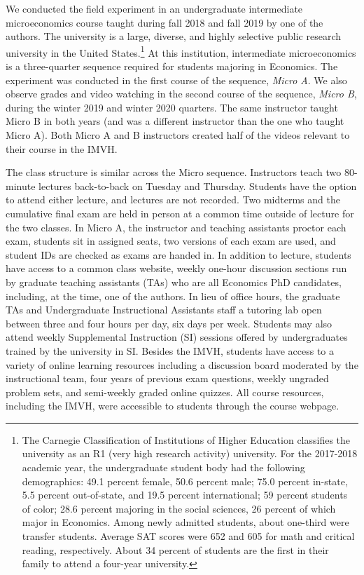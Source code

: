 We conducted the field experiment in an undergraduate intermediate microeconomics course taught during fall 2018 and fall 2019 by one of the authors.
The university is a large, diverse, and highly selective public research university in the United States.\footnote{The Carnegie Classification of Institutions of Higher Education classifies the university as an R1 (very high research activity) university.
    For the 2017-2018 academic year, the undergraduate student body had the following demographics: 49.1 percent female, 50.6 percent male; 75.0 percent in-state, 5.5 percent out-of-state, and 19.5 percent international; 59 percent students of color; 28.6 percent majoring in the social sciences, 26 percent of which major in Economics.
	Among newly admitted students, about one-third were transfer students.
	Average SAT scores were 652 and 605 for math and critical reading, respectively.
	About 34 percent of students are the first in their family to attend a four-year university.
}
At this institution, intermediate microeconomics is a three-quarter sequence required for students majoring in Economics.
The experiment was conducted in the first course of the sequence, \textit{Micro A}.
We also observe grades and video watching in the second course of the sequence, \textit{Micro B}, during the winter 2019 and winter 2020 quarters.
The same instructor taught Micro B in both years (and was a different instructor than the one who taught Micro A).
Both Micro A and B instructors created half of the videos relevant to their course in the IMVH.

The class structure is similar across the Micro sequence.
Instructors teach two 80-minute lectures back-to-back on Tuesday and Thursday.
Students have the option to attend either lecture, and lectures are not recorded.
Two midterms and the cumulative final exam are held in person at a common time outside of lecture for the two classes. 
In Micro A, the instructor and teaching assistants proctor each exam, students sit in assigned seats, two versions of each exam are used, and student IDs are checked as exams are handed in.
In addition to lecture, students have access to a common class website, weekly one-hour discussion sections run by graduate teaching assistants (TAs) who are all Economics PhD candidates, including, at the time, one of the authors.
In lieu of office hours, the graduate TAs and Undergraduate Instructional Assistants staff a tutoring lab open between three and four hours per day, six days per week.
Students may also attend weekly Supplemental Instruction (SI) sessions offered by undergraduates trained by the university in SI.
Besides the IMVH, students have access to a variety of online learning resources including a discussion board moderated by the instructional team, four years of previous exam questions, weekly ungraded problem sets, and semi-weekly graded online quizzes.
All course resources, including the IMVH, were accessible to students through the course webpage.

